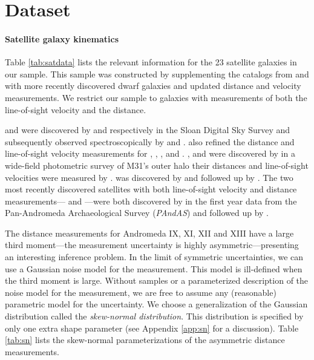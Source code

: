 \documentclass[preprint,12pt]{aastex}
\newcommand{\project}[1]{\emph{#1}}
\newcommand{\sdss}{\project{SDSS}}
\newcommand{\pandas}{\project{PAndAS}}
\newcommand{\Tab}[1]{Table \ref{tab:#1}}
\newcommand{\app}[1]{Appendix \ref{app:#1}}
\begin{document}
%
%

\section{Dataset}

\paragraph{Satellite galaxy kinematics}

\Tab{satdata} lists the relevant information for the 23 satellite
galaxies in our sample.  This sample was constructed by supplementing the
catalogs from \citet{Evans:2000a} and \cite{McConnachie:2006} with more
recently discovered dwarf galaxies and updated distance and velocity
measurements. We restrict our sample to galaxies with measurements of both
the line-of-sight velocity and the distance.

 and  were discovered by
\citet{Zucker:2004} and \citet{Zucker:2007} respectively in the Sloan Digital
Sky Survey \citep[\sdss;][]{York:2000} and subsequently observed
spectroscopically by \citet{Collins:2010} and \citet{Kalirai:2010}.
\citet{Kalirai:2010} also refined the distance and line-of-sight velocity
measurements for , ,
,  and .
,  and
 were discovered by \citet{Martin:2006} in a
wide-field photometric survey of M31's outer halo their distances and
line-of-sight velocities were measured by \citet{Collins:2010}.
 was discovered by \citet{Majewski:2007} and
followed up by \citet{Kalirai:2010}.  The two most recently discovered
satellites with both line-of-sight velocity and distance measurements---%
 and ---were
both discovered by \citet{Ibata:2007} in the first year data from the
Pan-Andromeda Archaeological Survey (\pandas) and followed up by
\citet{Letarte:2009}.

The distance measurements for Andromeda IX, XI, XII and XIII have a large
third moment---the measurement uncertainty is highly
asymmetric---presenting an interesting inference problem. In the limit of
symmetric uncertainties, we can use a Gaussian noise model for the
measurement. This model is ill-defined when the third moment is large.
Without samples or a parameterized description of the noise model for the
measurement, we are free to assume any (reasonable) parametric model for
the uncertainty. We choose a generalization of the Gaussian distribution
called the \emph{skew-normal distribution}. This distribution is
specified by only one extra shape parameter (see \app{sn} for a
discussion).  \Tab{sn} lists the skew-normal parameterizations of the
asymmetric distance measurements.
\end{document}
